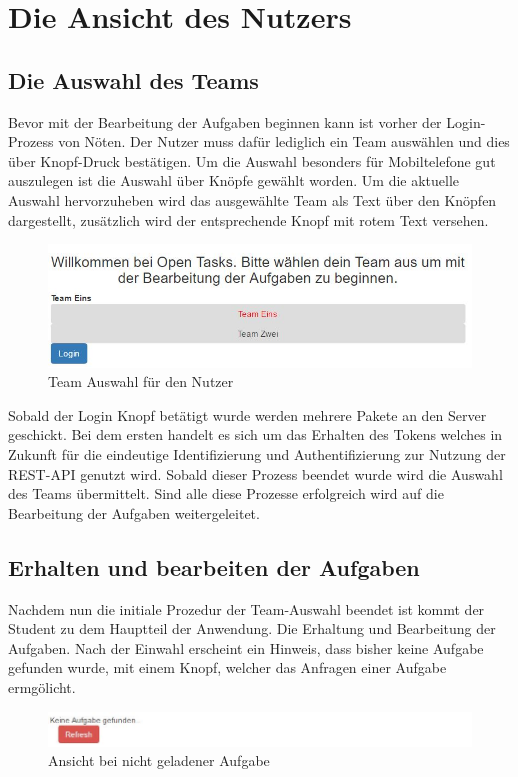 \section{Die Ansicht des Nutzers}


\subsection{Die Auswahl des Teams}

Bevor mit der Bearbeitung der Aufgaben beginnen kann ist vorher der Login-Prozess von Nöten. Der Nutzer muss dafür lediglich ein Team auswählen und dies über Knopf-Druck bestätigen. Um die Auswahl besonders für Mobiltelefone gut auszulegen ist die Auswahl über Knöpfe gewählt worden. Um die aktuelle Auswahl hervorzuheben wird das ausgewählte Team als Text über den Knöpfen dargestellt, zusätzlich wird der entsprechende Knopf mit rotem Text versehen.

\begin{figure}[htp]     %
\centering
\includegraphics[width=1\textwidth]{bilder/UserLogin} 
\caption[Login für den Nutzer / Teamauswahl]{Team Auswahl für den Nutzer}
\end{figure} 

Sobald der Login Knopf betätigt wurde werden mehrere Pakete an den Server geschickt. Bei dem ersten handelt es sich um das Erhalten des Tokens welches in Zukunft für die eindeutige Identifizierung und Authentifizierung zur Nutzung der REST-API genutzt wird. Sobald dieser Prozess beendet wurde wird die Auswahl des Teams übermittelt. Sind alle diese Prozesse erfolgreich wird auf die Bearbeitung der Aufgaben weitergeleitet. 

\subsection{Erhalten und bearbeiten der Aufgaben}

Nachdem nun die initiale Prozedur der Team-Auswahl beendet ist kommt der Student zu dem Hauptteil der Anwendung. Die Erhaltung und Bearbeitung der Aufgaben. Nach der Einwahl erscheint ein Hinweis, dass bisher keine Aufgabe gefunden wurde, mit einem Knopf, welcher das Anfragen einer Aufgabe ermgölicht. \\
\begin{figure}[htp]     %
\centering
\includegraphics[width=1\textwidth]{bilder/NoTask} 
\caption[Ansicht bei nicht geladener Aufgabe]{Ansicht bei nicht geladener Aufgabe}
\end{figure} 


